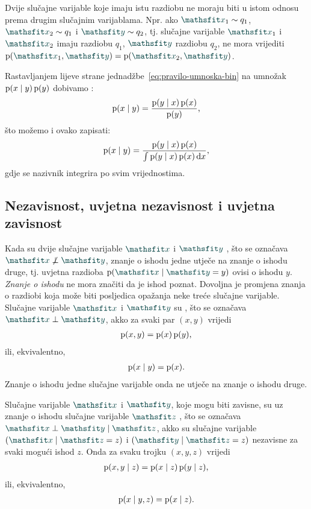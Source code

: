 \documentclass[utf8, diplomski, lmodern]{fer}
\begin{document}
Dvije slučajne varijable koje imaju istu razdiobu ne moraju biti u istom odnosu prema drugim slučajnim varijablama. Npr. ako $\rvar x_1\sim q_1$, $\rvar x_2\sim q_1$ i $\rvar y\sim q_2$, tj. slučajne varijable $\rvar x_1$ i $\rvar x_2$ imaju razdiobu $q_1$, $\rvar y$ razdiobu $q_2$, ne mora vrijediti $\p(\rvar x_1, \rvar y) = \p(\rvar x_2, \rvar y)$.

Rastavljanjem lijeve strane jednadžbe~\eqref{eq:pravilo-umnoska-bin} na umnožak $\operatorname*{\mathrm{p}}(x\mid y)\operatorname*{\mathrm{p}}(y)$ dobivamo :
\begin{align}
\operatorname*{\mathrm{p}}(x\mid y) = \frac{\operatorname*{\mathrm{p}}(y\mid x)\operatorname*{\mathrm{p}}(x)}{\operatorname*{\mathrm{p}}(y)} \text{,}
\end{align}
što možemo i ovako zapisati:
\begin{align}
\operatorname*{\mathrm{p}}(x\mid y) = \frac{\operatorname*{\mathrm{p}}(y\mid x)\operatorname*{\mathrm{p}}(x)}{\int\operatorname*{\mathrm{p}}(y\mid x)\operatorname*{\mathrm{p}}(x)\mathop{}\!\mathrm{d} x} \text{,}
\end{align}
gdje se nazivnik integrira po svim vrijednostima.

\subsection{Nezavisnost, uvjetna nezavisnost i uvjetna zavisnost}

Kada su dvije slučajne varijable $\rvar x$ i $\rvar y$ , što se označava $\rvar x\not\perp\rvar y$, znanje o ishodu jedne utječe na znanje o ishodu druge, tj. uvjetna razdioba $\p\del{\rvar x\mid\rvar y = y}$ ovisi o ishodu $y$. \textit{Znanje o ishodu} ne mora značiti da je ishod poznat. Dovoljna je promjena znanja o razdiobi koja može biti posljedica opažanja neke treće slučajne varijable. Slučajne varijable $\rvar x$ i $\rvar y$ su , što se označava $\rvar x\perp\rvar y$, akko za svaki par $(x, y)$ vrijedi
\begin{align}
\operatorname*{\mathrm{p}}(x,y)=\operatorname*{\mathrm{p}}(x)\operatorname*{\mathrm{p}}(y) \text{,}
\end{align}
ili, ekvivalentno,
\begin{align}
\operatorname*{\mathrm{p}}(x\mid y) = \operatorname*{\mathrm{p}}(x) \text{.}
\end{align}
Znanje o ishodu jedne slučajne varijable onda ne utječe na znanje o ishodu druge.

Slučajne varijable $\rvar x$ i $\rvar y$, koje mogu biti zavisne, su uz znanje o ishodu slučajne varijable $\rvar z$ , što se označava $\rvar x\perp\rvar y\mid\rvar z$, akko su slučajne varijable $\del{\rvar x\mid\rvar z=z}$ i $\del{\rvar y\mid\rvar z=z}$ nezavisne za svaki mogući ishod $z$. Onda za svaku trojku $(x,y,z)$ vrijedi
\begin{align}
\operatorname*{\mathrm{p}}(x,y\mid z) = \operatorname*{\mathrm{p}}(x\mid z)\operatorname*{\mathrm{p}}(y\mid z) \text{,}
\end{align}
 ili, ekvivalentno,
\begin{align}
\operatorname*{\mathrm{p}}(x\mid y,z) = \operatorname*{\mathrm{p}}(x\mid z) \text{.}
\end{align}
\end{document}
